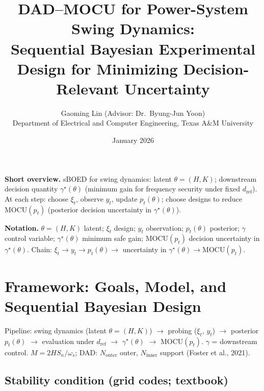 \documentclass[10pt]{article}
\newcommand{\MOCU}{\mathrm{MOCU}}
\newcommand{\Ninner}{N_{\mathrm{inner}}}
\newcommand{\Nouter}{N_{\mathrm{outer}}}
\begin{document}
\pagestyle{plain}

\title{\textbf{DAD--MOCU for Power-System Swing Dynamics:\\
Sequential Bayesian Experimental Design for Minimizing Decision-Relevant Uncertainty}}
\author{Gaoming Lin \;\; (Advisor: Dr.\ Byung-Jun Yoon)\\
Department of Electrical and Computer Engineering, Texas A\&M University}
\date{January 2026}

\maketitle

\vspace{-0.5em}
\noindent
\textbf{Short overview.}
sBOED for swing dynamics: latent $\theta=(H,K)$; downstream decision quantity $\gamma^\star(\theta)$ (minimum gain for frequency security under fixed $d_{\mathrm{ref}}$). At each step: choose $\xi_t$, observe $y_t$, update $p_t(\theta)$; choose designs to reduce $\MOCU(p_t)$ (posterior decision uncertainty in $\gamma^\star(\theta)$).

\medskip
\noindent
\textbf{Notation.}
$\theta=(H,K)$ latent; $\xi_t$ design; $y_t$ observation; $p_t(\theta)$ posterior; $\gamma$ control variable; $\gamma^\star(\theta)$ minimum safe gain; $\MOCU(p_t)$ decision uncertainty in $\gamma^\star(\theta)$. Chain: $\xi_t\to y_t\to p_t(\theta)\to$ uncertainty in $\gamma^\star(\theta)\to\MOCU(p_t)$.

\section{Framework: Goals, Model, and Sequential Bayesian Design}
\label{sec:setup}

Pipeline: swing dynamics (latent $\theta=(H,K)$) $\to$ probing ($\xi_t$, $y_t$) $\to$ posterior $p_t(\theta)$ $\to$ evaluation under $d_{\mathrm{ref}}$ $\to$ $\gamma^\star(\theta)$ $\to$ $\MOCU(p_t)$. $\gamma$ = downstream control. $M=2HS_n/\omega_s$; DAD: $\Nouter$ outer, $\Ninner$ support (Foster et al., 2021).

\subsection{Stability condition (grid codes; textbook)}
\label{sec:definitions}
\end{document}
